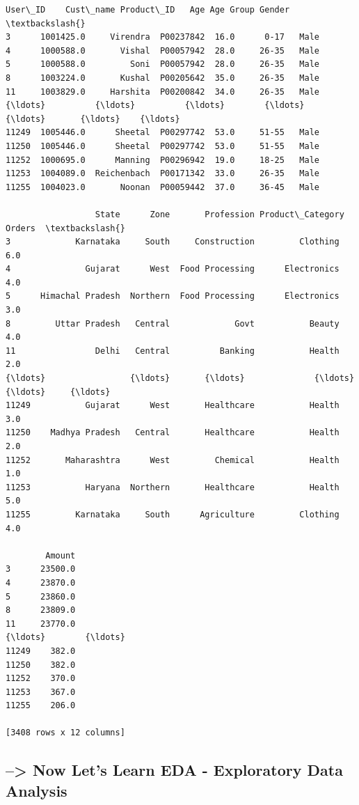 \documentclass[11pt]{article}
\makeatletter
\newcommand{\boxspacing}{\kern\kvtcb@left@rule\kern\kvtcb@boxsep}
\newcommand{\prompt}[4]{
        {\ttfamily\llap{{\color{#2}[#3]:\hspace{3pt}#4}}\vspace{-\baselineskip}}
    }
\makeatother
\begin{document}
            \begin{tcolorbox}[breakable, size=fbox, boxrule=.5pt, pad at break*=1mm, opacityfill=0]
\prompt{Out}{outcolor}{26}{\boxspacing}
\begin{Verbatim}[commandchars=\\\{\}]
         User\_ID    Cust\_name Product\_ID   Age Age Group Gender  \textbackslash{}
3      1001425.0     Virendra  P00237842  16.0      0-17   Male
4      1000588.0       Vishal  P00057942  28.0     26-35   Male
5      1000588.0         Soni  P00057942  28.0     26-35   Male
8      1003224.0       Kushal  P00205642  35.0     26-35   Male
11     1003829.0     Harshita  P00200842  34.0     26-35   Male
{\ldots}          {\ldots}          {\ldots}        {\ldots}   {\ldots}       {\ldots}    {\ldots}
11249  1005446.0      Sheetal  P00297742  53.0     51-55   Male
11250  1005446.0      Sheetal  P00297742  53.0     51-55   Male
11252  1000695.0      Manning  P00296942  19.0     18-25   Male
11253  1004089.0  Reichenbach  P00171342  33.0     26-35   Male
11255  1004023.0       Noonan  P00059442  37.0     36-45   Male

                  State      Zone       Profession Product\_Category  Orders  \textbackslash{}
3             Karnataka     South     Construction         Clothing     6.0
4               Gujarat      West  Food Processing      Electronics     4.0
5      Himachal Pradesh  Northern  Food Processing      Electronics     3.0
8         Uttar Pradesh   Central             Govt           Beauty     4.0
11                Delhi   Central          Banking           Health     2.0
{\ldots}                 {\ldots}       {\ldots}              {\ldots}              {\ldots}     {\ldots}
11249           Gujarat      West       Healthcare           Health     3.0
11250    Madhya Pradesh   Central       Healthcare           Health     2.0
11252       Maharashtra      West         Chemical           Health     1.0
11253           Haryana  Northern       Healthcare           Health     5.0
11255         Karnataka     South      Agriculture         Clothing     4.0

        Amount
3      23500.0
4      23870.0
5      23860.0
8      23809.0
11     23770.0
{\ldots}        {\ldots}
11249    382.0
11250    382.0
11252    370.0
11253    367.0
11255    206.0

[3408 rows x 12 columns]
\end{Verbatim}
\end{tcolorbox}
        
    \subsection{--\textgreater{} Now Let's Learn EDA - Exploratory Data
Analysis}\label{now-lets-learn-eda---exploratory-data-analysis}
\end{document}
